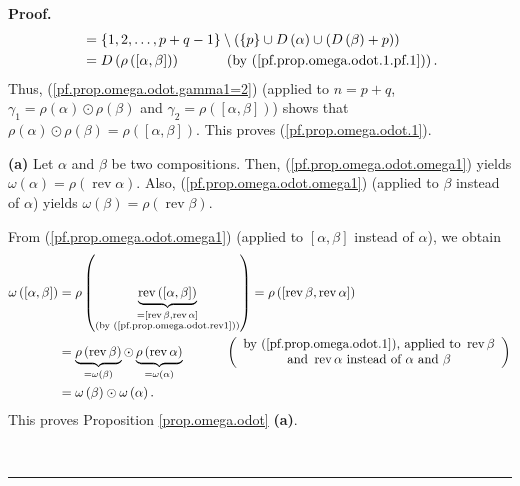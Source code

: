 \documentclass
[numbers=enddot,12pt,final,onecolumn,notitlepage,abstracton]{scrartcl}%
\theoremstyle{definition}
\newenvironment{proof}[1][Proof]{\noindent\textbf{#1.} }{\ \rule{0.5em}{0.5em}}
\newenvironment{verlong}{}{}
\begin{document}
\begin{verlong}
\begin{proof}
\begin{align*}
&  =\left\{  1,2,\ldots,p+q-1\right\}  \setminus\left(  \left\{  p\right\}
\cup D\left(  \alpha\right)  \cup\left(  D\left(  \beta\right)  +p\right)
\right) \\
&  =D\left(  \rho\left(  \left[  \alpha,\beta\right]  \right)  \right)
\ \ \ \ \ \ \ \ \ \ \left(  \text{by (\ref{pf.prop.omega.odot.1.pf.1}%
)}\right)  .
\end{align*}
Thus, (\ref{pf.prop.omega.odot.gamma1=2}) (applied to $n=p+q$, $\gamma
_{1}=\rho\left(  \alpha\right)  \odot\rho\left(  \beta\right)  $ and
$\gamma_{2}=\rho\left(  \left[  \alpha,\beta\right]  \right)  $) shows that
$\rho\left(  \alpha\right)  \odot\rho\left(  \beta\right)  =\rho\left(
\left[  \alpha,\beta\right]  \right)  $. This proves
(\ref{pf.prop.omega.odot.1}).

\textbf{(a)} Let $\alpha$ and $\beta$ be two compositions. Then,
(\ref{pf.prop.omega.odot.omega1}) yields $\omega\left(  \alpha\right)
=\rho\left(  \operatorname*{rev}\alpha\right)  $. Also,
(\ref{pf.prop.omega.odot.omega1}) (applied to $\beta$ instead of $\alpha$)
yields $\omega\left(  \beta\right)  =\rho\left(  \operatorname*{rev}%
\beta\right)  $.

From (\ref{pf.prop.omega.odot.omega1}) (applied to $\left[  \alpha
,\beta\right]  $ instead of $\alpha$), we obtain%
\begin{align*}
\omega\left(  \left[  \alpha,\beta\right]  \right)   &  =\rho\left(
\underbrace{\operatorname*{rev}\left(  \left[  \alpha,\beta\right]  \right)
}_{\substack{=\left[  \operatorname*{rev}\beta,\operatorname*{rev}%
\alpha\right]  \\\text{(by (\ref{pf.prop.omega.odot.rev1}))}}}\right)
=\rho\left(  \left[  \operatorname*{rev}\beta,\operatorname*{rev}%
\alpha\right]  \right) \\
&  =\underbrace{\rho\left(  \operatorname*{rev}\beta\right)  }_{=\omega\left(
\beta\right)  }\odot\underbrace{\rho\left(  \operatorname*{rev}\alpha\right)
}_{=\omega\left(  \alpha\right)  }\ \ \ \ \ \ \ \ \ \ \left(
\begin{array}
[c]{c}%
\text{by (\ref{pf.prop.omega.odot.1}), applied to }\operatorname*{rev}\beta\\
\text{and }\operatorname*{rev}\alpha\text{ instead of }\alpha\text{ and }\beta
\end{array}
\right) \\
&  =\omega\left(  \beta\right)  \odot\omega\left(  \alpha\right)  .
\end{align*}
This proves Proposition \ref{prop.omega.odot} \textbf{(a)}.


\end{proof}
\end{verlong}
\end{document}
